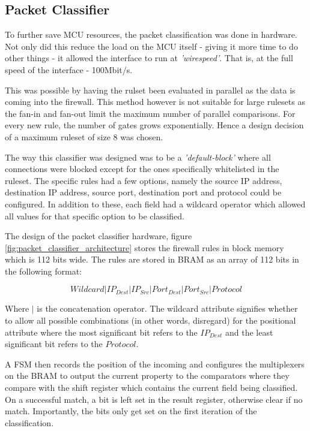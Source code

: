 \subsection{Packet Classifier}
\label{sec:packet_classifier}
To further save MCU resources, the packet classification was done in hardware. Not only did this reduce the load on the MCU itself - giving it more time to do other things - it allowed the interface to run at \textit{'wirespeed'}. That is, at the full speed of the interface - 100Mbit/s. 

This was possible by having the rulset been evaluated in parallel as the data is coming into the firewall. This method however is not suitable for large rulesets as the fan-in and fan-out limit the maximum number of parallel comparisons. For every new rule, the number of gates grows exponentially. Hence a design decision of a maximum ruleset of size 8 was chosen. 

The way this classifier was designed was to be a \textit{'default-block'} where all connections were blocked except for the ones specifically whitelisted in the ruleset. The specific rules had a few options, namely the source IP address, destination IP address, source port, destination port and protocol could be configured. In addition to these, each field had a wildcard operator which allowed all values for that specific option to be classified. 


The design of the packet classifier hardware, figure \ref{fig:packet_classifier_architecture} stores the firewall rules in block memory which is 112 bits wide. The rules are stored in BRAM as an array of 112 bits in the following format:

\[
Wildcard | IP_{Dest} |  IP_{Src}  | Port_{Dest} |  Port_{Src} | Protocol
\]

Where $|$ is the concatenation operator. The wildcard attribute signifies whether to allow all possible combinations (in other words, disregard) for the positional attribute where the most significant bit refers to the $IP_{Dest}$ and the least significant bit refers to the $Protocol$.

A FSM then records the position of the incoming and configures the multiplexers on the BRAM to output the current property to the comparators where they compare with the shift register which contains the current field being classified. On a successful match, a bit is left set in the result register, otherwise clear if no match. Importantly, the bits only get set on the first iteration of the classification. 

